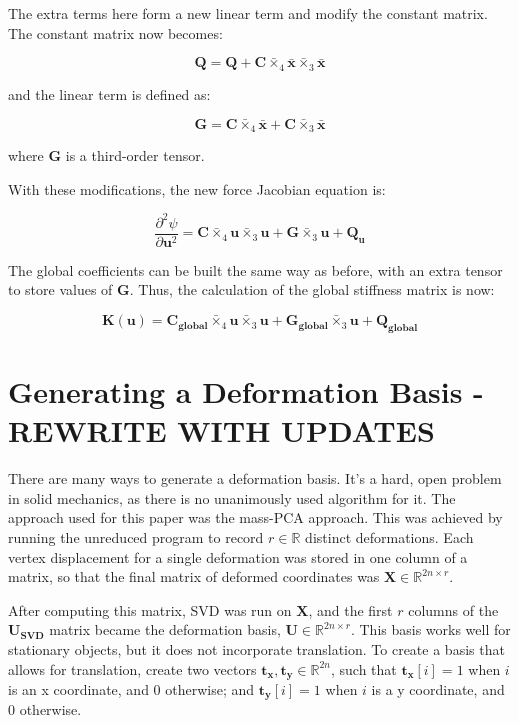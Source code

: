 \documentclass[twocolumn,10pt]{asme2ej}
\begin{document}
The extra terms here form a new linear term and modify the constant matrix. The constant matrix now becomes:

\begin{equation}
 \bm{Q} = \bm{Q} + \bm{C} \bar{\times}_4 \bm{\bar{x}} \bar{\times}_3 \bm{\bar{x}}
\end{equation}

\noindent and the linear term is defined as:

\begin{equation}
 \bm{G} = \bm{C} \bar{\times}_4 \bm{\bar{x}} + \bm{C} \bar{\times}_3 \bm{\bar{x}}
\end{equation}

\noindent where $\bm{G}$ is a third-order tensor.

With these modifications, the new force Jacobian equation is:

\begin{equation}
\frac{\partial^2 \psi}{\partial \bm{u}^2} = \bm{C} \bar{\times}_4 \bm{u} \bar{\times}_3 \bm{u}
+ \bm{G} \bar{\times}_3 \bm{u} + \bm{Q_u}
\end{equation}

The global coefficients can be built the same way as before, with an extra tensor to store values of $\bm{G}$. Thus, the calculation of the global stiffness matrix is now:

\begin{equation}
  \bm{K}(\bm{u}) = \bm{C_{global}} \bar{\times}_4 \bm{u} \bar{\times}_3 \bm{u}
  + \bm{G_{global}} \bar{\times}_3 \bm{u} + \bm{Q_{global}}
  \label{eq_globalStiffness}
\end{equation}

\section{Generating a Deformation Basis  - REWRITE WITH UPDATES}

There are many ways to generate a deformation basis. It's a hard, open problem in solid mechanics, as there is no unanimously used algorithm for it. The approach used for this paper was the mass-PCA approach. This was achieved by running the unreduced program to record $r \in \mathbb{R}$ distinct deformations. Each vertex displacement for a single deformation was stored in one column of a matrix, so that the final matrix of deformed coordinates was $\bm{X} \in \mathbb{R}^{2n \times r}$.

After computing this matrix, SVD was run on $\bm{X}$, and the first $r$ columns of the $\bm{U_{SVD}}$ matrix became the deformation basis, $\bm{U} \in \mathbb{R}^{2n \times r}$. This basis works well for stationary objects, but it does not incorporate translation. To create a basis that allows for translation, create two vectors $\bm{t_x}, \bm{t_y} \in \mathbb{R}^{2n}$, such that
$\bm{t_x}[i] = 1$ when $i$ is an x coordinate, and $0$ otherwise;
and $\bm{t_y}[i] = 1$ when $i$ is a y coordinate, and $0$ otherwise.
\end{document}
